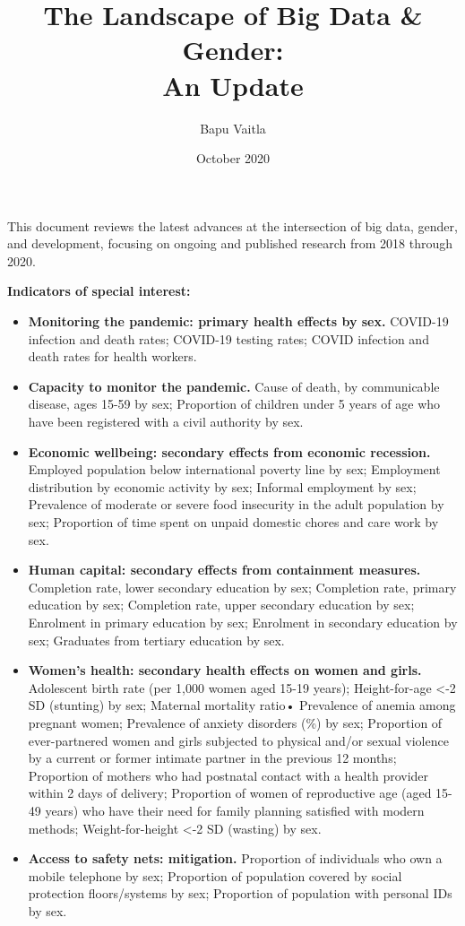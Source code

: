 \documentclass{article}
\title{The Landscape of Big Data \& Gender: \\An Update}
\author{Bapu Vaitla}
\date{October 2020}
\begin{document}
\maketitle

This document reviews the latest advances at the intersection of big data, gender, and development, focusing on ongoing and published research from 2018 through 2020.

\textbf{Indicators of special interest:}
\begin{itemize}
    \item {\textbf{Monitoring the pandemic: primary health effects by sex.} COVID-19 infection and death rates; COVID-19 testing rates; COVID infection and death rates for health workers.} 
    \item{\textbf{Capacity to monitor the pandemic.} Cause of death, by communicable disease, ages 15-59 by sex; Proportion of children under 5 years of age who have been registered with a civil authority by sex.}
    \item{\textbf{Economic wellbeing: secondary effects from economic recession.} Employed population below international poverty line by sex; Employment distribution by economic activity by sex; Informal employment by sex; Prevalence of moderate or severe food insecurity in the adult population by sex; Proportion of time spent on unpaid domestic chores and care work by sex.}
     \item{\textbf{Human capital: secondary effects from containment measures.} Completion rate, lower secondary education by sex; Completion rate, primary education by sex; Completion rate, upper secondary education by sex; Enrolment in primary education by sex; Enrolment in secondary education by sex; Graduates from tertiary education by sex.}
    \item{\textbf{Women's health: secondary health effects on women and girls.} Adolescent birth rate (per 1,000 women aged 15-19 years); Height-for-age <-2 SD (stunting) by sex; Maternal mortality ratio• Prevalence of anemia among pregnant women; Prevalence of anxiety disorders (\%) by sex; Proportion of ever-partnered women and girls subjected to physical and/or sexual violence by a current or former intimate partner in the previous 12 months; Proportion of mothers who had postnatal contact with a health provider within 2 days of delivery; Proportion of women of reproductive age (aged 15-49 years) who have their need for family planning satisfied with modern methods; Weight-for-height <-2 SD (wasting) by sex.}
    \item{\textbf{Access to safety nets: mitigation.} Proportion of individuals who own a mobile telephone by sex; Proportion of population covered by social protection floors/systems by sex; Proportion of population with personal IDs by sex.}

\end{itemize}
\end{document}
